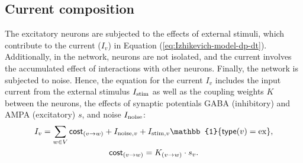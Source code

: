 \subsection{Current composition}
\label{sec:current-composition}

The excitatory neurons are subjected to the effects of external stimuli, which contribute to the current ($I_v$) in Equation (\ref{eq:Izhikevich-model-dp-dt}). Additionally, in the network, neurons are not isolated, and the current involves the accumulated effect of interactions with other neurons. Finally, the network is subjected to noise. 
Hence, the equation for the current $I_v$ includes the input current from the external stimulus $I_{\mathrm{stim}}$ as well as the coupling weights $K$ between the neurons, the effects of synaptic potentials GABA (inhibitory) and AMPA (excitatory) $s$, and noise $I_{\mathrm{noise}}$:
\begin{gather}
    I_v = 
    \sum_{w \in V} \cost_{(v \to w)} + I_{\noise, v} + I_{\stim, v} \mathbb{1} \{ \type(v) = \ex \},  \label{eq:current-components} \\
    \cost_{(v \to w)} = K_{(v \to w)} \cdot s_v. 
    \label{eq:cost-function}
\end{gather}

\begin{comment}

The definition of each component is provided in the next three sections.

In this project, the external input ($I_{\stim}$) is provided by a set of texture stimuli, and a grid network of PING oscillators is supposed to reflect local neural networks of the primary visual cortex (V1). The external stimuli is described in Section \ref{sec:external-stimuli}.

\end{comment}








